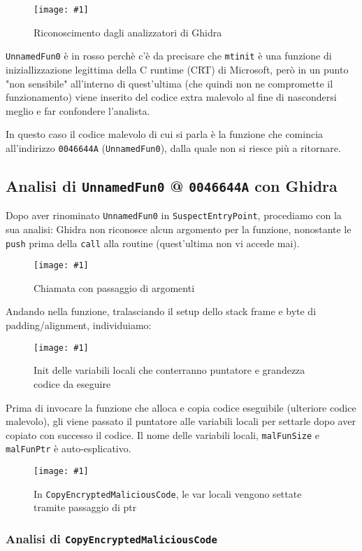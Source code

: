 \documentclass[
    a4paper, %
    11pt %
]{article}
\newcommand{\pic}[4]{\begin{figure}[H]
            \centering
            \texttt{[image: \#1]}
            \caption{#2}
            \label{fig:#1}
            \end{figure}}
\begin{document}
            \pic{mtinit_legit}{Riconoscimento dagli analizzatori di Ghidra}{15.5cm}{4.5cm}
            
            \texttt{UnnamedFun0} è in rosso perchè c'è da precisare che 
            \texttt{\textunderscore\textunderscore mtinit} è una funzione
            di iniziallizzazione legittima della C runtime (CRT) di Microsoft, però in un punto "non sensibile" all'interno di quest'ultima
            (che quindi non ne compromette il funzionamento) viene inserito del codice extra malevolo
            al fine di nascondersi meglio e far confondere l'analista. 
            
            In questo caso il codice malevolo
            di cui si parla è la funzione che comincia all'indirizzo \texttt{0046644A} 
            (\texttt{UnnamedFun0}), dalla quale non si riesce più a ritornare.

            \subsection{Analisi di \texttt{UnnamedFun0} @ \texttt{0046644A} con Ghidra}

            Dopo aver rinominato \texttt{UnnamedFun0} in \texttt{SuspectEntryPoint}, procediamo con la sua analisi:
            Ghidra non riconosce alcun argomento per la funzione, nonostante le \texttt{push} prima della \texttt{call}
            alla routine (quest'ultima non vi accede mai).
            
            \pic{suspectep_call}{Chiamata con passaggio di argomenti}{15cm}{3cm}

            Andando nella funzione, tralasciando il setup dello stack frame e byte di padding/alignment,
            individuiamo:

            \pic{see_init}{Init delle variabili locali che conterranno puntatore e grandezza codice da eseguire}{15cm}{5cm}

            Prima di invocare la funzione che alloca e copia codice eseguibile (ulteriore codice malevolo), gli viene passato il puntatore
            alle variabili locali per settarle dopo aver copiato con successo il codice. Il nome delle variabili locali,
            \texttt{malFunSize} e \texttt{malFunPtr} è auto-esplicativo.
            
            \pic{see_cemc}{In \texttt{CopyEncryptedMaliciousCode}, le var locali vengono settate tramite passaggio di ptr}
            {12cm}{7cm}

            \subsubsection{Analisi di \texttt{CopyEncryptedMaliciousCode}}
\end{document}
